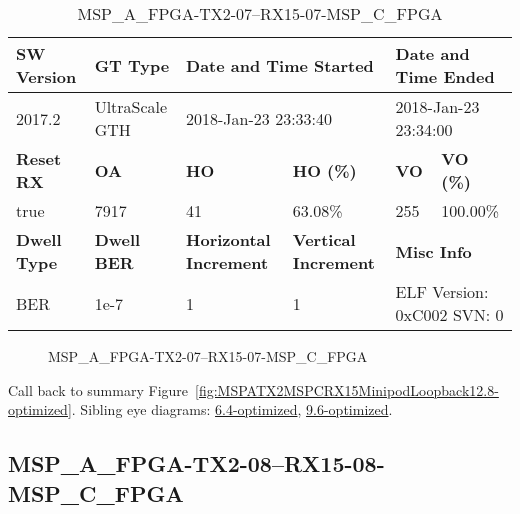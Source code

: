 \begin{table}[h]
\centering
\caption{MSP\_A\_FPGA-TX2-07--RX15-07-MSP\_C\_FPGA}
\label{tab:MSPAFPGATX207RX1507MSPCFPGA12.8-optimized}
\begin{tabular}{@{}|l|l|l|l|l|l|@{}}
\toprule
\textbf{SW Version}                & \textbf{GT Type}   & \multicolumn{2}{l|}{\textbf{Date and Time Started}}            & \multicolumn{2}{l|}{\textbf{Date and Time Ended}}        \\ \midrule
2017.2                       & UltraScale GTH          & \multicolumn{2}{l|}{2018-Jan-23 23:33:40}                   & \multicolumn{2}{l|}{2018-Jan-23 23:34:00}               \\ \midrule
\textbf{Reset RX}                  & \textbf{OA} & \textbf{HO}   & \textbf{HO (\%)} & \textbf{VO} & \textbf{VO (\%)} \\ \midrule
true & 7917        & 41          & 63.08\%        & 255        & 100.00\%       \\ \midrule
\textbf{Dwell Type}                & \textbf{Dwell BER} & \textbf{Horizontal Increment} & \textbf{Vertical Increment}    & \multicolumn{2}{l|}{\textbf{Misc Info}}                  \\ \midrule
BER                            & 1e-7        & 1        & 1           & \multicolumn{2}{l|}{ELF Version: 0xC002 SVN: 0}                         \\ \bottomrule
\end{tabular}
\end{table}

\begin{figure}[h]
\caption{MSP\_A\_FPGA-TX2-07--RX15-07-MSP\_C\_FPGA} \label{fig:MSPAFPGATX207RX1507MSPCFPGA12.8-optimized}
\end{figure}

Call back to summary Figure~\ref{fig:MSPATX2MSPCRX15MinipodLoopback12.8-optimized}.
Sibling eye diagrams: \hyperref[sec:MSPAFPGATX207RX1507MSPCFPGA6.4-optimized]{6.4-optimized}, \hyperref[sec:MSPAFPGATX207RX1507MSPCFPGA9.6-optimized]{9.6-optimized}.

\clearpage
\newpage


\subsection{MSP\_A\_FPGA-TX2-08--RX15-08-MSP\_C\_FPGA}\label{sec:MSPAFPGATX208RX1508MSPCFPGA12.8-optimized}

